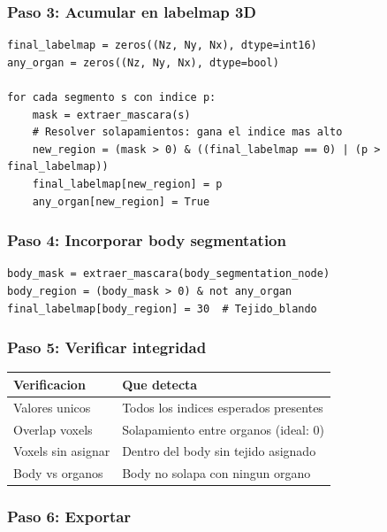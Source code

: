 \documentclass[12pt,a4paper]{article}
\begin{document}
\subsubsection{Paso 3: Acumular en labelmap 3D}

\begin{verbatim}
final_labelmap = zeros((Nz, Ny, Nx), dtype=int16)
any_organ = zeros((Nz, Ny, Nx), dtype=bool)

for cada segmento s con indice p:
    mask = extraer_mascara(s)
    # Resolver solapamientos: gana el indice mas alto
    new_region = (mask > 0) & ((final_labelmap == 0) | (p > final_labelmap))
    final_labelmap[new_region] = p
    any_organ[new_region] = True
\end{verbatim}

\subsubsection{Paso 4: Incorporar body segmentation}

\begin{verbatim}
body_mask = extraer_mascara(body_segmentation_node)
body_region = (body_mask > 0) & not any_organ
final_labelmap[body_region] = 30  # Tejido_blando
\end{verbatim}

\subsubsection{Paso 5: Verificar integridad}

\begin{table}[H]
\centering
\begin{tabular}{l l}
\toprule
\textbf{Verificacion} & \textbf{Que detecta} \\
\midrule
Valores unicos & Todos los indices esperados presentes \\
Overlap voxels & Solapamiento entre organos (ideal: 0) \\
Voxels sin asignar & Dentro del body sin tejido asignado \\
Body vs organos & Body no solapa con ningun organo \\
\bottomrule
\end{tabular}
\end{table}

\subsubsection{Paso 6: Exportar}
\end{document}
